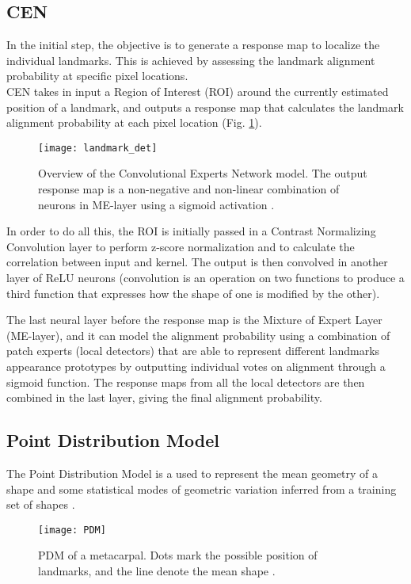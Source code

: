 \subsection{CEN}
In the initial step, the objective is to generate a response map to localize the individual landmarks. This is achieved by assessing the landmark alignment probability at specific pixel locations. \\
CEN takes in input a Region of Interest (ROI) around the currently estimated position of a landmark, and outputs a response map that calculates the landmark alignment probability at each pixel location (Fig. \ref{fig:landmark_det}).

\begin{figure}[H]
	\centering
	\texttt{[image: landmark\_det]}
	\caption{Overview of the Convolutional Experts Network model. The output response map is a non-negative and non-linear combination of neurons in ME-layer using a sigmoid activation \cite{Baltru2017}.}
	\label{fig:landmark_det}
\end{figure}

In order to do all this, the ROI is initially passed in a Contrast Normalizing Convolution layer to perform z-score normalization and to calculate the correlation between input and kernel. The output is then convolved in another layer of ReLU neurons (convolution is an operation on two functions to produce a third function that expresses how the shape of one is modified by the other).

The last neural layer before the response map is the Mixture of Expert Layer (ME-layer), and it can model the alignment probability using a combination of patch experts (local detectors) that are able to represent different landmarks appearance prototypes by outputting individual votes on alignment through a sigmoid function. The response maps from all the local detectors are then combined in the last layer, giving the final alignment probability.

\subsection{Point Distribution Model}
The Point Distribution Model is a used to represent the mean geometry of a shape and some statistical modes of geometric variation inferred from a training set of shapes \cite{wiki:PDM}. 

\begin{figure}[H]
	\centering
	\texttt{[image: PDM]}
	\caption{PDM of a metacarpal. Dots mark the possible position of landmarks, and the line denote the mean shape \cite{PDM}.}
	\label{fig:PDM}
\end{figure}

